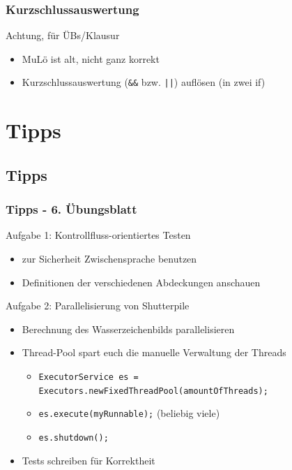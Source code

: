 \documentclass[18pt]{beamer}
\begin{document}
	\begin{frame}
		\frametitle{Kurzschlussauswertung}
		\begin{alertblock}{Achtung, für ÜBs/Klausur}
			\begin{itemize}
				\item MuLö ist alt, nicht ganz korrekt
				\item Kurzschlussauswertung (\texttt{\&\&} bzw. \texttt{||}) auflösen (in zwei if)
			\end{itemize}
		\end{alertblock}
	\end{frame}


\section{Tipps}
	\subsection{Tipps}
	\begin{frame}
		\frametitle{Tipps - 6. Übungsblatt}
		\begin{exampleblock}{Aufgabe 1: Kontrollfluss-orientiertes Testen}
			\begin{itemize}
				\item zur Sicherheit Zwischensprache benutzen
				\item Definitionen der verschiedenen Abdeckungen anschauen
			\end{itemize}
		\end{exampleblock}
		\pause
		\begin{exampleblock}{Aufgabe 2: Parallelisierung von Shutterpile} 
			\begin{itemize}
				\item Berechnung des Wasserzeichenbilds parallelisieren \pause
				\item Thread-Pool spart euch die manuelle Verwaltung der Threads
				\begin{itemize}
					\item \texttt{ExecutorService es = Executors.newFixedThreadPool(amountOfThreads);}
					\item \texttt{es.execute(myRunnable);} (beliebig viele)
					\item \texttt{es.shutdown();}
				\end{itemize} \pause
				\item Tests schreiben für Korrektheit
			\end{itemize}
		\end{exampleblock}
	\end{frame}
\end{document}
